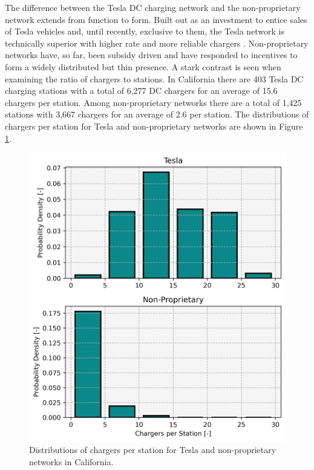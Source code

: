 \documentclass[11pt]{article}
\begin{document}
\begin{multicols}{2}
The difference between the Tesla DC charging network and the non-proprietary network extends from function to form. Built out as an investment to entice sales of Tesla vehicles and, until recently, exclusive to them, the Tesla network is technically superior with higher rate and more reliable chargers \cite{Rempel_2023, Kozumplik_2022}. Non-proprietary networks have, so far, been subsidy driven \cite{Gamage_2023} and have responded to incentives to form a widely distributed but thin presence. A stark contrast is seen when examining the ratio of chargers to stations. In California there are 403 Tesla DC charging stations with a total of 6,277 DC chargers for an average of 15.6 chargers per station. Among non-proprietary networks there are a total of 1,425 stations with 3,667 chargers for an average of 2.6 per station. The distributions of chargers per station for Tesla and non-proprietary networks are shown in Figure \ref{fig:network_histograms}.

\begin{figure}[H]
	\centering
	\includegraphics[width = \linewidth]{figs/California_Charger_Network_Histograms.png}
	\caption{Distributions of chargers per station for Tesla and non-proprietary networks in California.}
	\label{fig:network_histograms}
\end{figure}


\end{multicols}
\end{document}

